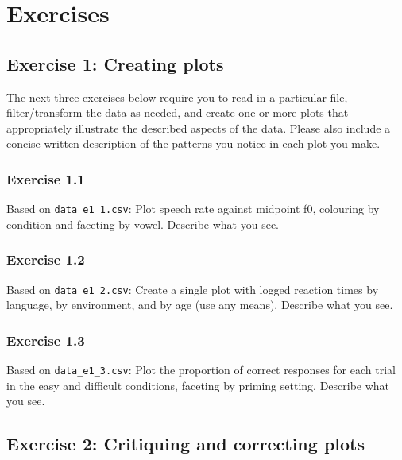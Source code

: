 \documentclass[
]{article}
\begin{document}
\newpage

\section{Exercises}\label{exercises}

\subsection{Exercise 1: Creating plots}\label{exercise-1-creating-plots}

The next three exercises below require you to read in a particular file,
filter/transform the data as needed, and create one or more plots that
appropriately illustrate the described aspects of the data. Please also
include a concise written description of the patterns you notice in each
plot you make.

\subsubsection{Exercise 1.1}\label{exercise-1.1}

Based on \texttt{data\_e1\_1.csv}: Plot speech rate against midpoint f0,
colouring by condition and faceting by vowel. Describe what you see.

\subsubsection{Exercise 1.2}\label{exercise-1.2}

Based on \texttt{data\_e1\_2.csv}: Create a single plot with logged
reaction times by language, by environment, and by age (use any means).
Describe what you see.

\subsubsection{Exercise 1.3}\label{exercise-1.3}

Based on \texttt{data\_e1\_3.csv}: Plot the proportion of correct
responses for each trial in the easy and difficult conditions, faceting
by priming setting. Describe what you see.

\newpage

\subsection{Exercise 2: Critiquing and correcting
plots}\label{exercise-2-critiquing-and-correcting-plots}
\end{document}
